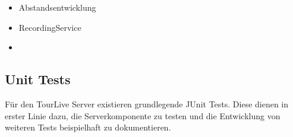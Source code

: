 \begin{itemize}
	\item Abstandsentwicklung
	\item RecordingService
	\item 
\end{itemize}

\subsection{Unit Tests}
\label{sec:unittests}
Für den TourLive Server existieren grundlegende JUnit Tests. Diese dienen in erster Linie dazu, die Serverkomponente zu testen und die Entwicklung von weiteren Tests beispielhaft zu dokumentieren.